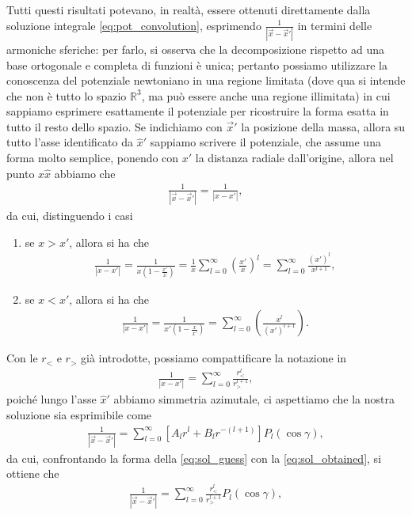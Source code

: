 Tutti questi risultati potevano, in realtà, essere ottenuti direttamente dalla soluzione integrale \eqref{eq:pot_convolution}, esprimendo $\frac{1}{|\vec{x} - \vec{x}'|}$ in termini delle armoniche sferiche: per farlo, si osserva che la decomposizione rispetto ad una base ortogonale e completa di funzioni è unica; pertanto possiamo utilizzare la conoscenza del potenziale newtoniano in una regione limitata (dove qua si intende che non è tutto lo spazio $\mathbb{R}^3$, ma può essere anche una regione illimitata) in cui sappiamo esprimere esattamente il potenziale per ricostruire la forma esatta in tutto il resto dello spazio. 
Se indichiamo con $\vec{x}'$ la posizione della massa, allora su tutto l'asse identificato da $\hat{x}'$ sappiamo scrivere il potenziale, che assume una forma molto semplice, ponendo con $x'$ la distanza radiale dall'origine, allora nel punto $x \hat{x}$ abbiamo che
\begin{align}
	\frac{1}{|\vec{x} - \vec{x}'|} = \frac{1}{|x-x'|}, 
\end{align}
da cui, distinguendo i casi
\begin{enumerate}[label=\protect\circled{\arabic*}]
	\item se $x > x'$, allora si ha che
		\begin{align}
			\frac{1}{|x-x'|} = \frac{1}{x(1 - \frac{x'}{x})} = \frac{1}{x} \sum_{l=0}^\infty \left( \frac{x'}{x}\right)^l = \sum_{l=0}^\infty \frac{(x')^l}{x^{l+1}},
		\end{align}
	\item se $x < x'$, allora si ha che
		\begin{align}
			\frac{1}{|x-x'|} = \frac{1}{x'(1 - \frac{x}{x'})} = \sum_{l=0}^\infty \left( \frac{x^l}{(x')^{l+1}} \right).
		\end{align}
\end{enumerate}
Con le $r_<$ e $r_>$ già introdotte, possiamo compattificare la notazione in
\begin{align} \label{eq:sol_obtained}
	\frac{1}{|x-x'|} = \sum_{l=0}^\infty \frac{r_<^l}{r_>^{l+1}},
\end{align}
poiché lungo l'asse $\hat{x}'$ abbiamo simmetria azimutale, ci aspettiamo che la nostra soluzione sia esprimibile come
\begin{align} \label{eq:sol_guess}
	\frac{1}{|\vec{x}-\vec{x}'|} = \sum_{l=0}^\infty [A_l r^l + B_l r^{-(l+1)}] P_l(\cos{\gamma}),
\end{align}
da cui, confrontando la forma della \eqref{eq:sol_guess} con la \eqref{eq:sol_obtained}, si ottiene che
\begin{align}
	\frac{1}{|\vec{x}-\vec{x}'|} = \sum_{l=0}^\infty \frac{r_<^l}{r_>^{l+1}} P_l(\cos{\gamma}),
\end{align}
